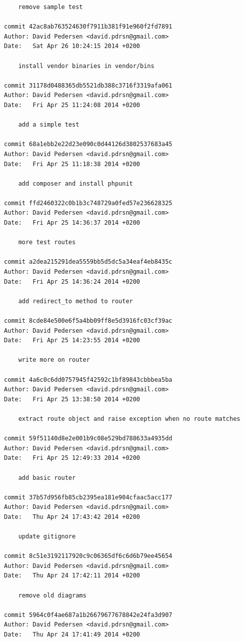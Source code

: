 \documentclass[12pt]{article}
\begin{document}
\begin{verbatim}
    remove sample test

commit 42ac8ab763524630f7911b381f91e960f2fd7891
Author: David Pedersen <david.pdrsn@gmail.com>
Date:   Sat Apr 26 10:24:15 2014 +0200

    install vendor binaries in vendor/bins

commit 31178d0488365db5521db388c3716f3319afa061
Author: David Pedersen <david.pdrsn@gmail.com>
Date:   Fri Apr 25 11:24:08 2014 +0200

    add a simple test

commit 68a1ebb2e22d23e090c0d44126d3802537683a45
Author: David Pedersen <david.pdrsn@gmail.com>
Date:   Fri Apr 25 11:18:38 2014 +0200

    add composer and install phpunit

commit ffd2460322c0b1b3c748729a0fed57e236628325
Author: David Pedersen <david.pdrsn@gmail.com>
Date:   Fri Apr 25 14:36:37 2014 +0200

    more test routes

commit a2dea215291dea5559bb5d5dc5a34eaf4eb8435c
Author: David Pedersen <david.pdrsn@gmail.com>
Date:   Fri Apr 25 14:36:24 2014 +0200

    add redirect_to method to router

commit 8cde84e500e6f5a4bb09ff8e5d3916fc03cf39ac
Author: David Pedersen <david.pdrsn@gmail.com>
Date:   Fri Apr 25 14:23:55 2014 +0200

    write more on router

commit 4a6c0c6dd0757945f42592c1bf89843cbbbea5ba
Author: David Pedersen <david.pdrsn@gmail.com>
Date:   Fri Apr 25 13:38:50 2014 +0200

    extract route object and raise exception when no route matches

commit 59f51140d8e2e001b9c08e529bd788633a4935dd
Author: David Pedersen <david.pdrsn@gmail.com>
Date:   Fri Apr 25 12:49:33 2014 +0200

    add basic router

commit 37b57d956fb85cb2395ea181e904cfaac5acc177
Author: David Pedersen <david.pdrsn@gmail.com>
Date:   Thu Apr 24 17:43:42 2014 +0200

    update gitignore

commit 8c51e3192117920c9c06365df6c6d6b79ee45654
Author: David Pedersen <david.pdrsn@gmail.com>
Date:   Thu Apr 24 17:42:11 2014 +0200

    remove old diagrams

commit 5964c0f4ae687a1b26679677678842e24fa3d907
Author: David Pedersen <david.pdrsn@gmail.com>
Date:   Thu Apr 24 17:41:49 2014 +0200


\end{verbatim}
\end{document}
